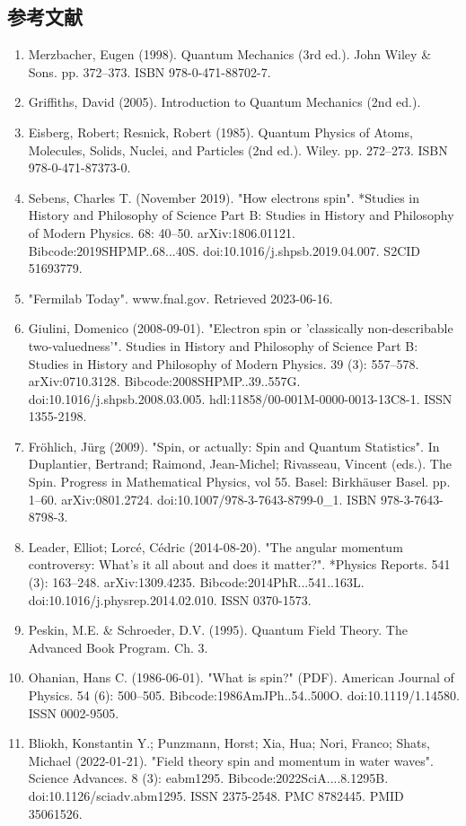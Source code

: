 \subsection{参考文献}
\begin{enumerate}
\item Merzbacher, Eugen (1998). Quantum Mechanics (3rd ed.). John Wiley & Sons. pp. 372–373. ISBN 978-0-471-88702-7.  
\item Griffiths, David (2005). Introduction to Quantum Mechanics (2nd ed.).  
\item Eisberg, Robert; Resnick, Robert (1985). Quantum Physics of Atoms, Molecules, Solids, Nuclei, and Particles (2nd ed.). Wiley. pp. 272–273. ISBN 978-0-471-87373-0.  
\item Sebens, Charles T. (November 2019). "How electrons spin". *Studies in History and Philosophy of Science Part B: Studies in History and Philosophy of Modern Physics. 68: 40–50. arXiv:1806.01121. Bibcode:2019SHPMP..68...40S. doi:10.1016/j.shpsb.2019.04.007. S2CID 51693779.  
\item "Fermilab Today". www.fnal.gov. Retrieved 2023-06-16.  
\item Giulini, Domenico (2008-09-01). "Electron spin or 'classically non-describable two-valuedness'". Studies in History and Philosophy of Science Part B: Studies in History and Philosophy of Modern Physics. 39 (3): 557–578. arXiv:0710.3128. Bibcode:2008SHPMP..39..557G. doi:10.1016/j.shpsb.2008.03.005. hdl:11858/00-001M-0000-0013-13C8-1. ISSN 1355-2198.  
\item Fröhlich, Jürg (2009). "Spin, or actually: Spin and Quantum Statistics". In Duplantier, Bertrand; Raimond, Jean-Michel; Rivasseau, Vincent (eds.). The Spin. Progress in Mathematical Physics, vol 55. Basel: Birkhäuser Basel. pp. 1–60. arXiv:0801.2724. doi:10.1007/978-3-7643-8799-0_1. ISBN 978-3-7643-8798-3.  
\item Leader, Elliot; Lorcé, Cédric (2014-08-20). "The angular momentum controversy: What's it all about and does it matter?". *Physics Reports. 541 (3): 163–248. arXiv:1309.4235. Bibcode:2014PhR...541..163L. doi:10.1016/j.physrep.2014.02.010. ISSN 0370-1573.  
\item Peskin, M.E. & Schroeder, D.V. (1995). Quantum Field Theory. The Advanced Book Program. Ch. 3.  
\item Ohanian, Hans C. (1986-06-01). "What is spin?" (PDF). American Journal of Physics. 54 (6): 500–505. Bibcode:1986AmJPh..54..500O. doi:10.1119/1.14580. ISSN 0002-9505.  
\item Bliokh, Konstantin Y.; Punzmann, Horst; Xia, Hua; Nori, Franco; Shats, Michael (2022-01-21). "Field theory spin and momentum in water waves". Science Advances. 8 (3): eabm1295. Bibcode:2022SciA....8.1295B. doi:10.1126/sciadv.abm1295. ISSN 2375-2548. PMC 8782445. PMID 35061526.  

\end{enumerate}
